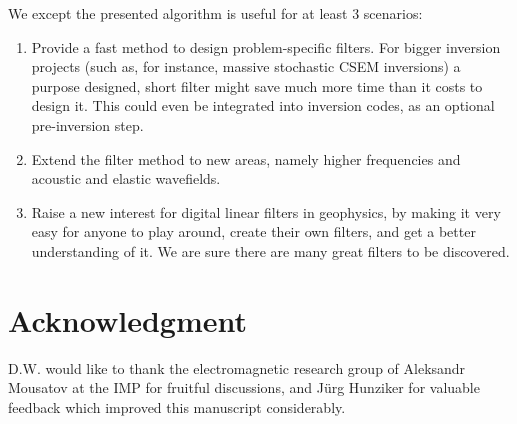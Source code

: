 \documentclass[paper,twocolumn,twoside]{geophysics}
\begin{document}
We except the presented algorithm is useful for at least 3 scenarios:
\begin{enumerate}
  \item Provide a fast method to design problem-specific filters. For bigger
    inversion projects (such as, for instance, massive stochastic CSEM
    inversions) a purpose designed, short filter might save much more time than
    it costs to design it. This could even be integrated into inversion codes,
    as an optional pre-inversion step.
  \item Extend the filter method to new areas, namely higher frequencies and
    acoustic and elastic wavefields.
  \item Raise a new interest for digital linear filters in geophysics, by
    making it very easy for anyone to play around, create their own filters,
    and get a better understanding of it. We are sure there are many great
    filters to be discovered.
\end{enumerate}

\section{Acknowledgment}

D.W. would like to thank the electromagnetic research group of Aleksandr
Mousatov at the IMP for fruitful discussions, and Jürg Hunziker for valuable
feedback which improved this manuscript considerably.
\end{document}
